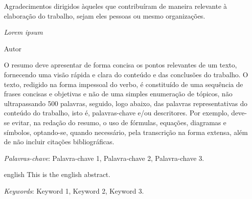\documentclass[
	12pt,			%
	openright,		%
	oneside,	
	a4paper,		%
	english,		%
	brazil			%
]{abntex2/abntex2}  %
\begin{document}
\begin{agradecimentos}

Agradecimentos dirigidos àqueles que contribuíram de maneira relevante à elaboração do trabalho, sejam eles pessoas ou mesmo organizações.

\end{agradecimentos}

\begin{epigrafe}
    \vspace*{\fill}
	\begin{flushright}
		\textit{Lorem ipsum}

		Autor
	\end{flushright}\vspace{4cm}
\end{epigrafe}


\setlength{\absparsep}{18pt} %
\begin{resumo}

 	O resumo deve apresentar de forma concisa os pontos relevantes de um texto, fornecendo uma visão rápida e clara do conteúdo e das conclusões do trabalho. O texto, redigido na forma impessoal do verbo, é constituído de uma sequência de frases concisas e objetivas e não de uma simples enumeração de tópicos, não ultrapassando 500 palavras, seguido, logo abaixo, das palavras representativas do conteúdo do trabalho, isto é, palavras-chave e/ou descritores. Por exemplo, deve-se evitar, na redação do resumo, o uso de fórmulas, equações, diagramas e símbolos, optando-se, quando necessário, pela transcrição na forma extensa, além de não incluir citações bibliográficas.

 \textit{Palavras-chave}: Palavra-chave 1, Palavra-chave 2, Palavra-chave 3.

\end{resumo}

\begin{resumo}[Abstract]
 \begin{otherlanguage*}{english}
   This is the english abstract.

   \vspace{\onelineskip}
 
   \noindent 
   \textit{Keywords}: Keyword 1, Keyword 2, Keyword 3.
 \end{otherlanguage*}
\end{resumo}
\end{document}
